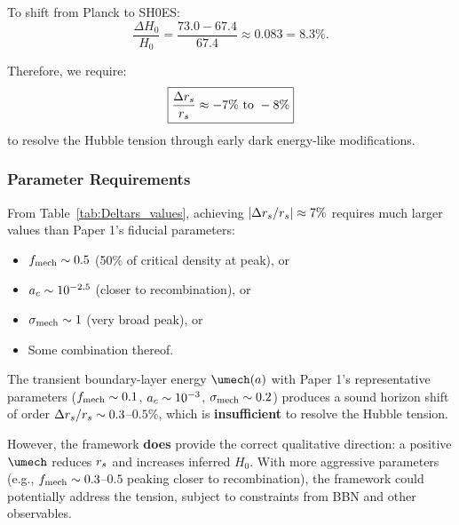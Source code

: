 To shift from Planck to SH0ES:
\begin{equation}
\frac{\Delta H_0}{H_0} = \frac{73.0 - 67.4}{67.4} \approx 0.083 = 8.3\%.
\end{equation}

Therefore, we require:
\begin{equation}
\boxed{\frac{\Delta r_s}{r_s} \approx -7\% \text{ to } -8\%}
\end{equation}
to resolve the Hubble tension through early dark energy-like modifications.

\subsubsection{Parameter Requirements}

From Table~\ref{tab:Deltars_values}, achieving $|\Delta r_s/r_s| \approx 7\%$ requires much larger values than Paper 1's fiducial parameters:
\begin{itemize}
\item $f_{\mathrm{mech}} \sim 0.5$ (50\% of critical density at peak), or
\item $a_c \sim 10^{-2.5}$ (closer to recombination), or
\item $\sigma_{\mathrm{mech}} \sim 1$ (very broad peak), or
\item Some combination thereof.
\end{itemize}

\begin{proposition}
\label{prop:H0_tension_conclusion}
The transient boundary-layer energy $\umech(a)$ with Paper 1's representative parameters ($f_{\mathrm{mech}} \sim 0.1$, $a_c \sim 10^{-3}$, $\sigma_{\mathrm{mech}} \sim 0.2$) produces a sound horizon shift of order $\Delta r_s/r_s \sim 0.3$--$0.5\%$, which is \textbf{insufficient} to resolve the Hubble tension.

However, the framework \textbf{does} provide the correct qualitative direction: a positive $\umech$ reduces $r_s$ and increases inferred $H_0$. With more aggressive parameters (e.g., $f_{\mathrm{mech}} \sim 0.3$--$0.5$ peaking closer to recombination), the framework could potentially address the tension, subject to constraints from BBN and other observables.
\end{proposition}



